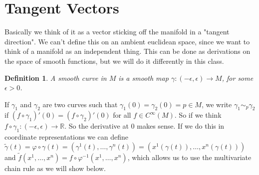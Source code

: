 \documentclass[a4paper]{article}
\newtheorem*{defn}{Definition}
\begin{document}
\section*{Tangent Vectors}
Basically we think of it as a vector sticking off the manifold in a "tangent direction". We can't define this on an ambient euclidean space, since we want to think of a manifold as an independent thing. This can be done as derivations on the space of smooth functions, but we will do it differently in this class. 

\begin{defn}
    A smooth curve in $M$ is a smooth map $\gamma: (-\epsilon, \epsilon) \rightarrow M$, for some $\epsilon > 0$. 
\end{defn}
If $\gamma_1$ and $\gamma_2$ are two curves such that $\gamma_1(0) = \gamma_2(0) = p \in M$, we write $\gamma_1 \sim_{p} \gamma_2$ if $(f \circ \gamma_1)'(0) = (f \circ \gamma_2)'(0)$ for all $f \in C^{\infty}(M)$. So if we think $f \circ \gamma_1: (-\epsilon, \epsilon) \rightarrow \mathds{R}$. So the derivative at $0$ makes sense. If we do this in coordinate representations we can define $\tilde{\gamma}(t) = \varphi \circ \gamma(t) = (\gamma^1(t), \dots, \gamma^n(t)) = (x^1(\gamma(t)), \dots, x^n(\gamma(t)))$ and $\tilde{f}(x^1, \dots, x^n) = f \circ \varphi^{-1}(x^1, \dots, x^n)$, which allows us to use the multivariate chain rule as we will show below.
\end{document}

